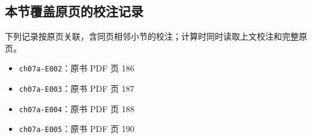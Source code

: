 \documentclass[
  10pt,
  fontset=fandol]{ctexart}
\providecommand{\tightlist}{%
  \setlength{\itemsep}{0pt}\setlength{\parskip}{0pt}}
\begin{document}
\subsection{本节覆盖原页的校注记录}\label{ux672cux8282ux8986ux76d6ux539fux9875ux7684ux6821ux6ce8ux8bb0ux5f55}

下列记录按原页关联，含同页相邻小节的校注；计算时同时读取上文校注和完整原页。

\begin{itemize}
\tightlist
\item
  \texttt{ch07a-E002}：原书 PDF 页 186
\item
  \texttt{ch07a-E003}：原书 PDF 页 187
\item
  \texttt{ch07a-E004}：原书 PDF 页 188
\item
  \texttt{ch07a-E005}：原书 PDF 页 190
\end{itemize}
\end{document}
